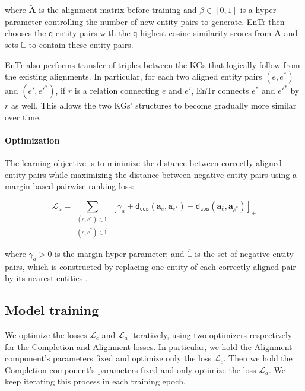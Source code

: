\documentclass[11pt]{article}
\begin{document}
\noindent 
where $\mathbf{\widetilde A}$ is the alignment matrix before training and $\beta \in [0, 1]$ is a hyper-parameter controlling the number of new entity pairs to generate. 
EnTr then chooses the $\mathsf{q}$  entity pairs with the $\mathsf{q}$ highest cosine similarity scores from $\mathbf{A}$ and sets $\mathbb{L}$ to contain these entity pairs. 

EnTr also performs transfer of triples between the KGs that logically follow from the existing alignments. In particular, for each two aligned entity pairs $(e, e^*)$ and $(e', {e'}^*)$, if $r$ is a relation connecting $e$ and $e'$, EnTr connects $e^*$ and ${e'}^*$ by $r$ as well. This allows the two KGs' structures to become gradually more similar over time. 


\paragraph{Optimization}
The learning objective is to minimize the distance between correctly aligned entity pairs while maximizing the distance between negative entity pairs using a  margin-based pairwise ranking loss:

\begin{equation}
    \mathcal{L}_{a} = \sum_{\substack{(e, e^*) \in \mathbb{L} \\ (\overline{e}, \overline{e}^*) \in \overline{\mathbb{L}}}} [\gamma_{a} + \mathsf{d}_{\mathtt{cos}}(\mathbf{a}_e, \mathbf{a}_{e^*}) - \mathsf{d}_{\mathtt{cos}}(\mathbf{a}_{\overline{e}}, \mathbf{a}_{\overline{e}^*})]_+
    \label{eqn:aligncomp_loss}
\end{equation}

\noindent where $\gamma_{a} > 0$ is the margin hyper-parameter; and $\overline{\mathbb{L}}$ is the set of negative entity pairs, which is constructed by replacing one entity of each correctly aligned pair by its nearest entities \cite{wu2019relation}. 


\subsection{Model training}\label{ssec:training}

We optimize the losses $\mathcal{L}_{c}$ and $\mathcal{L}_{a}$ iteratively, using two optimizers respectively for the Completion and Alignment losses.  In particular, we hold the Alignment component's parameters fixed and optimize only the loss  $\mathcal{L}_{c}$. Then we hold the Completion component's parameters fixed and only optimize the loss $\mathcal{L}_{a}$. We keep iterating this process in each training epoch.
\end{document}
